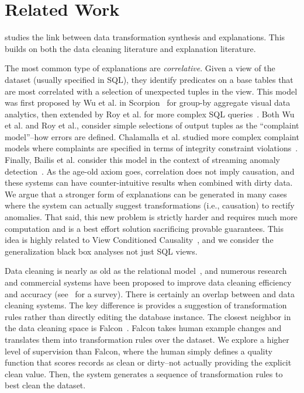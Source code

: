 \section{Related Work}
\sys studies the link between data transformation synthesis and explanations. This builds on both the data cleaning literature and explanation literature.

The most common type of explanations are \emph{correlative}. Given a view of the dataset (usually specified in SQL), they  identify predicates on a base tables that are most correlated with a selection of unexpected tuples in the view. This model was first proposed by Wu et al. in Scorpion~\cite{scorpion} for group-by aggregate visual data analytics, then extended by Roy et al. for more complex SQL queries~\cite{roy2015explaining}. Both Wu et al. and Roy et al., consider simple selections of output tuples as the ``complaint model''--how errors are defined. Chalamalla et al. studied more complex complaint models where complaints are specified in terms of integrity constraint violations~\cite{DBLP:conf/sigmod/ChalamallaIOP14}.
Finally, Bailis et al. consider this model in the context of streaming anomaly detection~\cite{bailis2016macrobase}. As the age-old axiom goes, correlation does not imply causation, and these systems can have counter-intuitive results when combined with dirty data. We argue that a stronger form of explanations can be generated in many cases where the system can actually suggest transformations (i.e., causation) to rectify anomalies. That said, this new problem is strictly harder and requires much more computation and is a best effort solution sacrificing provable guarantees.
This idea is highly related to View Conditioned Causality~\cite{meliou2011tracing}, and we consider the generalization black box analyses not just SQL views.

Data cleaning is nearly as old as the relational model~\cite{codd1970relational}, and numerous research and  commercial systems have been proposed to improve data cleaning efficiency and accuracy (see~\cite{rahm2000data} for a survey). 
There is certainly an overlap between \sys and data cleaning systems.
The key difference is \sys provides a suggestion of transformation rules rather than directly editing the database instance.
The closest neighbor in the data cleaning space is Falcon~\cite{he2016interactive}.
Falcon takes human example changes and translates them into transformation rules over the dataset.
We explore a higher level of supervision than Falcon, where the human simply defines a quality function that scores records as clean or dirty--not actually providing the explicit clean value.
Then, the system generates a sequence of transformation rules to best clean the dataset.


